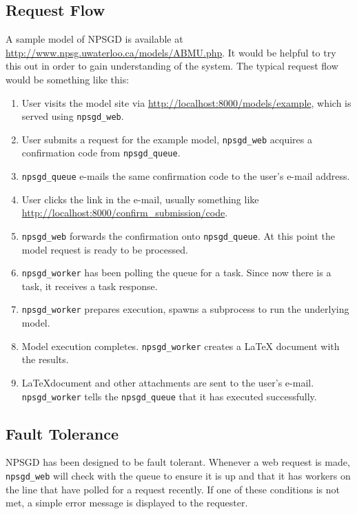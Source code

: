 \documentclass{article}
\begin{document}
\subsection{Request Flow}
A sample model of NPSGD is available at
\url{http://www.npsg.uwaterloo.ca/models/ABMU.php}. It would be helpful to try
this out in order to gain understanding of the system. The typical request flow
would be something like this:
\begin{enumerate}
    \item User visits the model site via \url{http://localhost:8000/models/example},
    which is served using \texttt{npsgd\_web}.

    \item User submits a request for the example model, \texttt{npsgd\_web}
    acquires a confirmation code from \texttt{npsgd\_queue}.

    \item \texttt{npsgd\_queue} e-mails the same confirmation code to the user's e-mail
    address.
    
    \item User clicks the link in the e-mail, usually something like
    \url{http://localhost:8000/confirm\_submission/code}. 

    \item \texttt{npsgd\_web} forwards the confirmation onto
    \texttt{npsgd\_queue}. At this point the model request is ready to be
    processed.

    \item \texttt{npsgd\_worker} has been polling the queue for a task. Since
    now there is a task, it receives a task response.

    \item \texttt{npsgd\_worker} prepares execution, spawns a subprocess to run
    the underlying model.
    
    \item Model execution completes. \texttt{npsgd\_worker} creates a \LaTeX
    document with the results.

    \item \LaTeX document and other attachments are sent to the user's e-mail.
    \texttt{npsgd\_worker} tells the \texttt{npsgd\_queue} that it has executed successfully.
\end{enumerate}

\subsection{Fault Tolerance}
NPSGD has been designed to be fault tolerant. Whenever a web request is made,
\texttt{npsgd\_web} will check with the queue to ensure it is up and that it has
workers on the line that have polled for a request recently. If one of these
conditions is not met, a simple error message is displayed to the requester.
\end{document}
